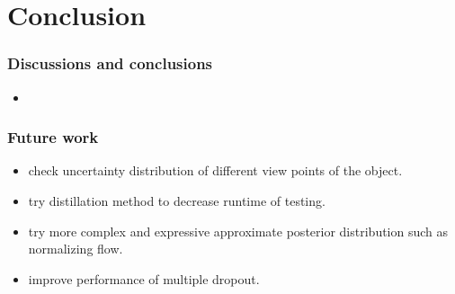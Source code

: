\chapter{Conclusion}
\subsection{Discussions and conclusions}

\begin{itemize}
	\item 
\end{itemize}


\subsection{Future work}
\begin{itemize}
	\item check uncertainty distribution of different view points of the object.
	\item try distillation method to decrease runtime of testing.
	\item try more complex and expressive approximate posterior distribution such as normalizing flow.
	\item improve performance of multiple dropout.
\end{itemize}